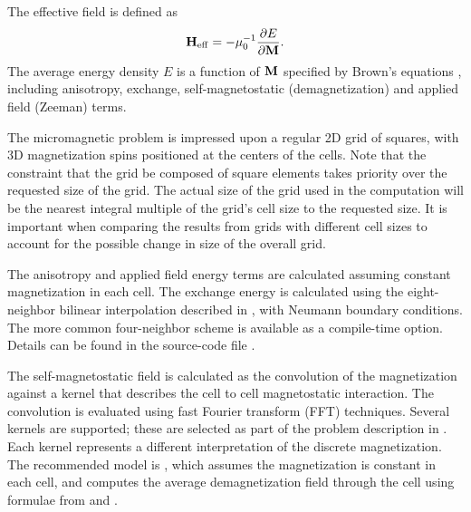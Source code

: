 The effective field is defined as
\html{\begin{center}}
\begin{displaymath}
  \textbf{H}_{\rm eff} = -\mu_0^{-1} \frac{\partial E}{\partial\textbf{M}}.
\end{displaymath}
\html{\end{center}}
The average energy density $E$ is a function of
$\textbf{M}$ specified by Brown's equations \cite{brown78}, including
anisotropy,
exchange, self-magnetostatic
(demagnetization) and applied
field (Zeeman) terms.

The micromagnetic problem is impressed upon a regular 2D
grid of squares, with 3D magnetization spins positioned at
the centers of the cells.  Note that the constraint that the grid be
composed of square elements takes priority over the requested size of
the grid.  The actual size of the grid used in the computation will be
the nearest integral multiple of the grid's cell size to the requested
size.  It is important when comparing the results from grids with
different cell sizes to account for the possible change in size of the
overall grid.

The anisotropy and applied field energy terms are calculated
assuming constant magnetization in each cell.  The exchange energy is
calculated using the eight-neighbor bilinear interpolation described in
\cite{donahue97}, with Neumann boundary conditions.  The more common
four-neighbor scheme is available as a compile-time option.  Details can
be found in the source-code file .

The self-magnetostatic field is calculated as the convolution of the
magnetization against a kernel that describes the cell to cell
magnetostatic interaction.  The convolution is evaluated using fast
Fourier transform (FFT) techniques.  Several kernels are
supported; these are selected as part of the problem description in
.  Each kernel represents a different
interpretation of the discrete magnetization.  The recommended model is
, which assumes the magnetization is constant in each cell,
and computes the average demagnetization field through the cell using
formulae from \cite{newell93} and \cite{aharoni98}.

